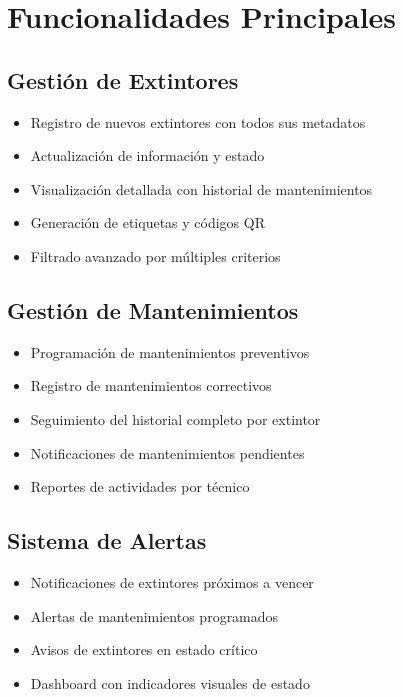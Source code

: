 \documentclass[11pt,a4paper]{article}
\begin{document}
\section{Funcionalidades Principales}

\subsection{Gestión de Extintores}

\begin{itemize}
    \item Registro de nuevos extintores con todos sus metadatos
    \item Actualización de información y estado
    \item Visualización detallada con historial de mantenimientos
    \item Generación de etiquetas y códigos QR
    \item Filtrado avanzado por múltiples criterios
\end{itemize}

\subsection{Gestión de Mantenimientos}

\begin{itemize}
    \item Programación de mantenimientos preventivos
    \item Registro de mantenimientos correctivos
    \item Seguimiento del historial completo por extintor
    \item Notificaciones de mantenimientos pendientes
    \item Reportes de actividades por técnico
\end{itemize}

\subsection{Sistema de Alertas}

\begin{itemize}
    \item Notificaciones de extintores próximos a vencer
    \item Alertas de mantenimientos programados
    \item Avisos de extintores en estado crítico
    \item Dashboard con indicadores visuales de estado
\end{itemize}
\end{document}
